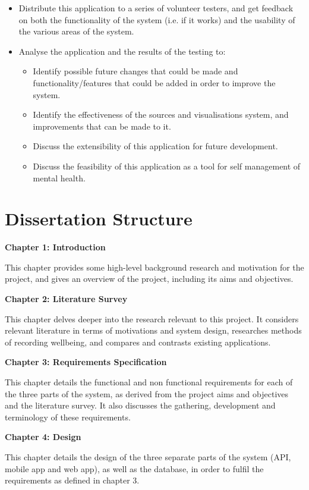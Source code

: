 \documentclass[11pt,openright,a4paper]{report}
\begin{document}
\begin{itemize}
\item Distribute this application to a series of volunteer testers, and get feedback on both the functionality of the system (i.e. if it works) and the usability of the various areas of the system.
\item Analyse the application and the results of the testing to:
\begin{itemize}
  \item Identify possible future changes that could be made and functionality/features that could be added in order to improve the system.
  \item Identify the effectiveness of the sources and visualisations system, and improvements that can be made to it.
  \item Discuss the extensibility of this application for future development.
  \item Discuss the feasibility of this application as a tool for self management of mental health.
\end{itemize}

\end{itemize}

\section{Dissertation Structure}
\textbf{Chapter 1: Introduction}

This chapter provides some high-level background research and motivation for the project, and gives an overview of the project, including its aims and objectives.

\textbf{Chapter 2: Literature Survey}

This chapter delves deeper into the research relevant to this project. It considers relevant literature in terms of motivations and system design, researches methods of recording wellbeing, and compares and contrasts existing applications.

\textbf{Chapter 3: Requirements Specification}

This chapter details the functional and non functional requirements for each of the three parts of the system, as derived from the project aims and objectives and the literature survey. It also discusses the gathering, development and terminology of these requirements.

\textbf{Chapter 4: Design}

This chapter details the design of the three separate parts of the system (API, mobile app and web app), as well as the database, in order to fulfil the requirements as defined in chapter 3.
\end{document}
